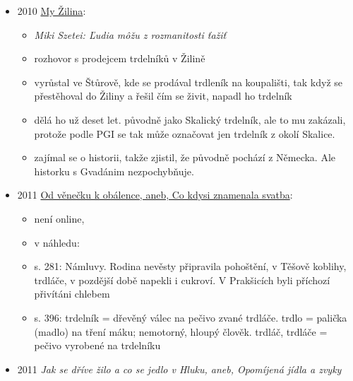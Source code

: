 \begin{itemize}
  \begin{itemize}
  \tightlist
  \item
    překlad z německého originálu \emph{Das grosse Buch der Kuchen und
    Torten}
  \item
    je tam recept na trdelník, ale očividně je to tyrolský prügelkrapfen
  \end{itemize}
\item
  2010
  \href{https://my.sme.sk/zilina/c/miki-szetei-ludia-mozu-z-rozmanitosti-tazit}{My
  Žilina}:

  \begin{itemize}
  \tightlist
  \item
    \emph{Miki Szetei: Ľudia môžu z rozmanitosti ťažiť}
  \item
    rozhovor s prodejcem trdelníků v Žilině
  \item
    vyrůstal ve Štůrově, kde se prodával trdleník na koupališti, tak
    když se přestěhoval do Žiliny a řešil čím se živit, napadl ho
    trdelník
  \item
    dělá ho už deset let. původně jako Skalický trdelník, ale to mu
    zakázali, protože podle PGI se tak může označovat jen trdelník z
    okolí Skalice.
  \item
    zajímal se o historii, takže zjistil, že původně pochází z Německa.
    Ale historku s Gvadánim nezpochybňuje.
  \end{itemize}
\item
  2011
  \href{https://ceskadigitalniknihovna.cz/uuid/uuid:05e8afb0-ef6c-11e5-bdc9-005056827e52}{Od
  věnečku k obálence, aneb, Co kdysi znamenala svatba}:

  \begin{itemize}
  \tightlist
  \item
    není online,
  \item
    v náhledu:
  \item
    s. 281: Námluvy. Rodina nevěsty připravila pohoštění, v Těšově
     koblihy, trdláče, v
    pozdější době napekli i cukroví. V Prakšicích byli příchozí
    přivítáni chlebem
  \item
    s. 396: trdelník = dřevěný válec na pečivo zvané trdláče. trdlo =
    palička (madlo) na tření máku; nemotorný, hloupý člověk. trdláč,
    trdláče = pečivo vyrobené na trdelníku
  \end{itemize}
\item
  2011 \emph{Jak se dříve žilo a co se jedlo v Hluku, aneb, Opomíjená
  jídla a zvyky}


\end{itemize}
